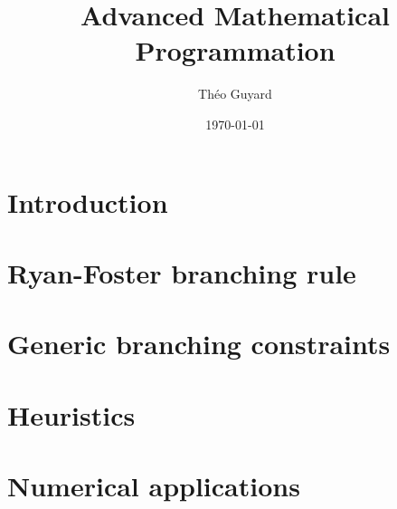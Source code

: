\documentclass{article}
\title{Advanced Mathematical Programmation}
\author{Théo Guyard}
\date{\today}
\begin{document}


\tableofcontents
\newpage

\section{Introduction}



\newpage

\section{Ryan-Foster branching rule}


\newpage

\section{Generic branching constraints}


\newpage

\section{Heuristics}

\newpage

\section{Numerical applications}



\newpage

\printbibliography
\end{document}
